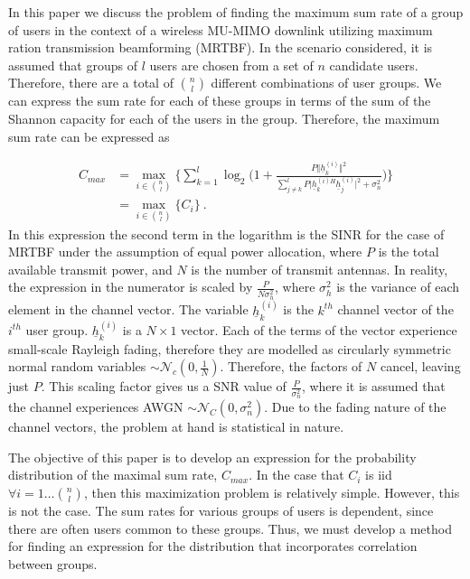 In this paper we discuss the problem of finding the maximum sum rate of a group of users in the context of a wireless MU-MIMO downlink utilizing maximum ration transmission beamforming (MRTBF). In the scenario considered, it is assumed that groups of $l$ users are chosen from a set of $n$ candidate users. Therefore, there are a total of $\binom{n}{l}$ different combinations of user groups. We can express the sum rate for each of these groups in terms of the sum of the Shannon capacity for each of the users in the group. Therefore, the maximum sum rate can be expressed as

\begin{equation}\label{eq:c_max}
    \begin{aligned}
    C_{max} &= \max_{i\in\binom{n}{l}}\bigg\lbrace \sum_{k=1}^l\log_2\bigg(1+\frac{P\Vert\underline{h}^{(i)}_k \Vert^2}{\sum_{j\neq k}^lP\vert \underline{h}^{(i)H}_k \underline{h}^{(i)}_j\vert^2 + \sigma_n^2}\bigg)\bigg\rbrace \\
    &= \max_{i\in\binom{n}{l}}\lbrace C_i\rbrace \ .
    \end{aligned}
\end{equation}
In this expression the second term in the logarithm is the SINR for the case of MRTBF under the assumption of equal power allocation, where $P$ is the total available transmit power, and $N$ is the number of transmit antennas. In reality, the expression in the numerator is scaled by $\frac{P}{N\sigma_h^2}$, where $\sigma_h^2$ is the variance of each element in the channel vector.  The variable $\underline{h}_k^{(i)}$ is the $k^{th}$ channel vector of the $i^{th}$ user group. $\underline{h}_k^{(i)}$ is a $N\times 1$ vector. Each of the terms of the vector experience small-scale Rayleigh fading, therefore they are modelled as circularly symmetric normal random variables $\sim\mathcal{N}_c(0,\frac{1}{N})$. Therefore, the factors of $N$ cancel, leaving just $P$. This scaling factor gives us a SNR value of $\frac{P}{\sigma_n^2}$, where it is assumed that the channel experiences AWGN $\sim\mathcal{N}_C(0,\sigma_n^2)$. Due to the fading nature of the channel vectors, the problem at hand is statistical in nature.

The objective of this paper is to develop an expression for the probability distribution of the maximal sum rate, $C_{max}$. 
In the case that $C_i$ is iid $\forall  i = 1\ldots\binom{n}{l}$, then this maximization problem is relatively simple. However, this is not the case. The sum rates for various groups of users is dependent, since there are often users common to these groups. Thus, we must develop a method for finding an expression for the distribution that incorporates correlation between groups.

